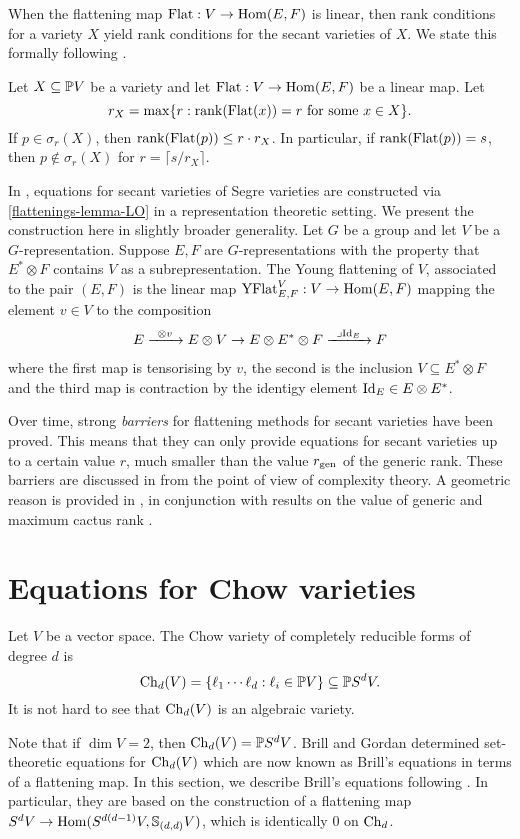 When the flattening map $\mathrm{Flat} : V \to \operatorname{Hom}(E,F)$ is linear, then rank conditions for a variety $X$ yield rank conditions for the secant varieties of $X$. We state this formally following \cite[Prop. 4.1.1]{LO13}.
\begin{lemma}
 \label{RepTheory-lemma-LandsbergOttaviani411}
 Let $X \subseteq \mathbb{P} V$ be a variety and let $\mathrm{Flat} : V \to \operatorname{Hom}(E,F)$ be a linear map. Let 
 \[
 r_X = \max \{ r : \mathrm{rank} ( \mathrm{Flat}(x)) = r \text{ for some $x \in X$}\}.
 \]
If $p \in \sigma_r(X)$, then $\mathrm{rank}(\mathrm{Flat}(p)) \leq r \cdot r_X$. In particular, if $\mathrm{rank}(\mathrm{Flat}(p)) = s$, then $p \notin \sigma_r (X)$ for $r = \lceil s / r_X \rceil$.
\end{lemma}
In \cite{LO13}, equations for secant varieties of Segre varieties are constructed via \ref{flattenings-lemma-LO} in a representation theoretic setting. We present the construction here in slightly broader generality. Let $G$ be a group and let $V$ be a $G$-representation. Suppose $E,F$ are $G$-representations with the property that $E^* \otimes F$ contains $V$ as a subrepresentation. The Young flattening of $V$, associated to the pair $(E,F)$ is the linear map $\mathrm{YFlat}^V_{E,F} : V \to \operatorname{Hom}( E,F)$ mapping the element $v \in V$ to the composition
\begin{align*}
E \xto{\otimes v} E \otimes V \to E \otimes E^* \otimes F \xto{\lrcorner \Id_E} F
\end{align*}
where the first map is tensorising by $v$, the second is the inclusion $V \subseteq E^* \otimes F$ and the third map is contraction by the identigy element $\mathrm{Id}_E \in E \otimes E^*$.

Over time, strong \emph{barriers} for flattening methods for secant varieties have been proved. This means that they can only provide equations for secant varieties up to a certain value $r$, much smaller than the value $r_{\mathrm{gen}}$ of the generic rank. These barriers are discussed in \cite{EGOW18} from the point of view of complexity theory. A geometric reason is provided in \cite{Gal17}, in conjunction with results on the value of generic and maximum cactus rank \cite{BR13,BBG19}. 

\section{Equations for Chow varieties}
\label{RepTheory-section-chowvarieties}

Let $V$ be a vector space. The Chow variety of completely reducible forms of degree $d$ is
\[
\mathrm{Ch}_d(V) = \{ \ell_1 \cdots \ell_d : \ell_i \in \mathbb{P} V\} \subseteq \mathbb{P} S^d V.
\]
It is not hard to see that $\mathrm{Ch}_d(V)$ is an algebraic variety. 

Note that if $\dim V = 2$, then $\mathrm{Ch}_d(V) = \mathbb{P} S^d V$. Brill \cite{Bri98} and Gordan \cite{Gor94} determined set-theoretic equations for $\mathrm{Ch}_d(V)$ which are now known as Brill's equations in terms of a flattening map. In this section, we describe Brill's equations following \cite{Lan12,Gua18}. In particular, they are based on the construction of a flattening map $S^d V \to \operatorname{Hom}(S^{d(d-1)} V, \mathbb{S}_{(d,d)} V )$, which is identically $0$ on $\mathrm{Ch}_d$. 




